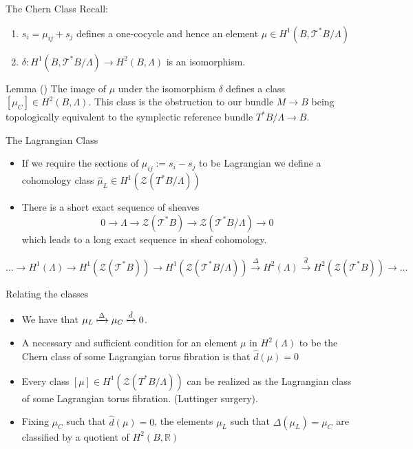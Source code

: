 \begin{frame}[c]{The Chern Class}
	Recall:
	\begin{enumerate}
		\item $s_i = \mu_{ij} + s_j $ defines a one-cocycle and hence an element $\mu \in H^1(B, \mathcal{T}^*B/\Lambda)$
		\item $\delta: H^1(B, \mathcal{T}^*B/\Lambda) \to H^2(B,
			      \Lambda)$ is an isomorphism.
	\end{enumerate}
	\begin{kulblock}{Lemma (\cite{ActionAngle})}
		The image of $\mu$ under the isomorphism $\delta$ defines a class $[\mu_C] \in H^2(B,
			\Lambda)$. This class is the obstruction to our bundle $M \to B$ being topologically equivalent to the
		symplectic reference bundle $T^*B/\Lambda \to B$.
	\end{kulblock}
\end{frame}

\begin{frame}[c]{The Lagrangian Class}
	\begin{itemize}
		\item 	If we require the sections of $\mu_{ij}:=s_i - s_j$ to be Lagrangian we define
		      a cohomology class $\hat{\mu}_L \in H^1(\mathcal{Z}(T^*B/\Lambda))$
		\item There is a short exact sequence of sheaves $$0 \to \Lambda \to
			      \mathcal{Z}(\mathcal{T}^*B) \to \mathcal{Z}(\mathcal{T}^*B/\Lambda) \to 0$$
		      which leads to a long exact sequence in sheaf cohomology.
	\end{itemize}
	$$\dots \to H^1(\Lambda) \to
		H^1(\mathcal{Z}(\mathcal{T}^*B)) \to H^1(\mathcal{Z}(\mathcal{T}^*B/\Lambda)) \xrightarrow{\Delta} H^2(\Lambda) \xrightarrow{\hat{d}} H^2(\mathcal{Z}(\mathcal{T}^*B)) \to  \dots$$
\end{frame}

\begin{frame}[c]{Relating the classes}
	\begin{itemize}
		\item We have that $\mu_L \xmapsto{\Delta} \mu_C \xmapsto{\hat{d}} 0$.
		\item A necessary and sufficient condition for an element $\mu$ in $H^2(\Lambda)$ to
		      be the Chern class of some Lagrangian torus fibration is that $\hat{d}(\mu) =
			      0$
		\item Every class $[\mu] \in H^1(\mathcal{Z}(T^*B/\Lambda))$ can be realized as the
		      Lagrangian class of some Lagrangian torus fibration. (Luttinger surgery).
		\item Fixing $\mu_C$ such that $\hat{d}(\mu) = 0$, the elements $\mu_L$ such that
		      $\Delta(\mu_L) = \mu_C$ are classified by a quotient of $H^2(B, \mathbb{R})$
	\end{itemize}
\end{frame}

